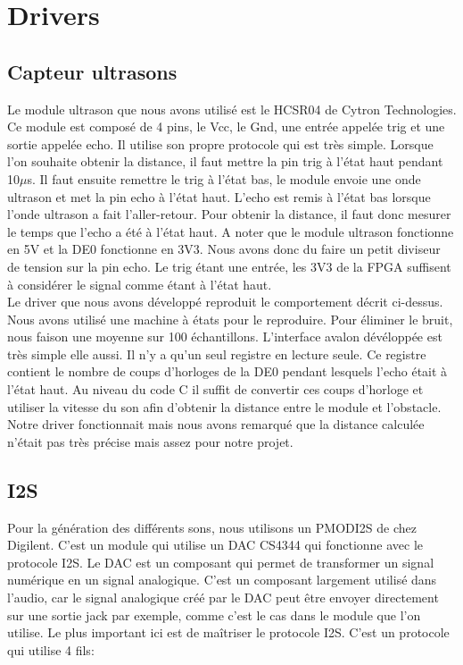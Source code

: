 \documentclass[a4paper]{article}
\begin{document}
\section{Drivers}
\subsection{Capteur ultrasons}
Le module ultrason que nous avons utilisé est le HCSR04 de Cytron Technologies.
Ce module est composé de 4 pins, le Vcc, le Gnd, une entrée appelée trig et une
sortie appelée echo. Il utilise son propre protocole qui est très simple. Lorsque l'on
souhaite obtenir la distance, il faut mettre la pin trig à l'état haut pendant
10$\mu$s. Il faut ensuite remettre le trig à l'état bas, le module envoie une onde
ultrason et met la pin echo à l'état haut. L'echo est remis à l'état bas lorsque
l'onde ultrason a fait l'aller-retour. Pour obtenir la distance, il faut donc mesurer
le temps que l'echo a été à l'état haut. A noter que le module ultrason fonctionne
en 5V et la DE0 fonctionne en 3V3. Nous avons donc du faire un petit diviseur de tension
sur la pin echo. Le trig étant une entrée, les 3V3 de la FPGA suffisent à considérer
le signal comme étant à l'état haut. \\

Le driver que nous avons développé reproduit le comportement décrit ci-dessus.
Nous avons utilisé une machine à états pour le reproduire. Pour éliminer le bruit,
nous faison une moyenne sur 100 échantillons. L'interface avalon dévéloppée est
très simple elle aussi. Il n'y a qu'un seul registre en lecture seule. Ce registre
contient le nombre de coups d'horloges de la DE0 pendant lesquels l'echo était à
l'état haut. Au niveau du code C il suffit de convertir ces coups d'horloge et
utiliser la vitesse du son afin d'obtenir la distance entre le module et l'obstacle.
Notre driver fonctionnait mais nous avons remarqué que la distance calculée n'était
pas très précise mais assez pour notre projet.

\subsection{I2S}

Pour la génération des différents sons, nous utilisons un PMODI2S de chez Digilent.
C'est un module qui utilise un DAC CS4344 qui fonctionne avec le protocole I2S. Le DAC
est un composant qui permet de transformer un signal numérique en un signal analogique.
C'est un composant largement utilisé dans l'audio, car le signal analogique créé par le DAC peut
être envoyer directement sur une sortie jack par exemple, comme c'est le cas dans le module que l'on utilise.
Le plus important ici est de maîtriser le protocole I2S. C'est un protocole qui utilise
4 fils:
\end{document}
